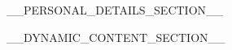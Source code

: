 \documentclass[a4paper,11pt]{article}
\begin{document}
__PERSONAL_DETAILS_SECTION__

__DYNAMIC_CONTENT_SECTION__
\end{document}
